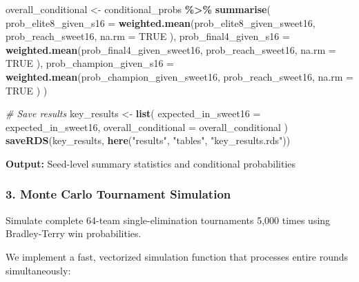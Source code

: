 \documentclass[
]{article}
\newenvironment{Shaded}{\begin{snugshade}}{\end{snugshade}}
\newcommand{\AttributeTok}[1]{\textcolor[rgb]{0.13,0.29,0.53}{#1}}
\newcommand{\CommentTok}[1]{\textcolor[rgb]{0.56,0.35,0.01}{\textit{#1}}}
\newcommand{\ConstantTok}[1]{\textcolor[rgb]{0.56,0.35,0.01}{#1}}
\newcommand{\FunctionTok}[1]{\textcolor[rgb]{0.13,0.29,0.53}{\textbf{#1}}}
\newcommand{\NormalTok}[1]{#1}
\newcommand{\OtherTok}[1]{\textcolor[rgb]{0.56,0.35,0.01}{#1}}
\newcommand{\SpecialCharTok}[1]{\textcolor[rgb]{0.81,0.36,0.00}{\textbf{#1}}}
\newcommand{\StringTok}[1]{\textcolor[rgb]{0.31,0.60,0.02}{#1}}
\begin{document}
\begin{Shaded}
\begin{Highlighting}[]
\NormalTok{overall\_conditional }\OtherTok{\textless{}{-}}\NormalTok{ conditional\_probs }\SpecialCharTok{\%\textgreater{}\%}
    \FunctionTok{summarise}\NormalTok{(}
        \AttributeTok{prob\_elite8\_given\_s16 =} \FunctionTok{weighted.mean}\NormalTok{(prob\_elite8\_given\_sweet16,}
\NormalTok{            prob\_reach\_sweet16,}
            \AttributeTok{na.rm =} \ConstantTok{TRUE}
\NormalTok{        ),}
        \AttributeTok{prob\_final4\_given\_s16 =} \FunctionTok{weighted.mean}\NormalTok{(prob\_final4\_given\_sweet16,}
\NormalTok{            prob\_reach\_sweet16,}
            \AttributeTok{na.rm =} \ConstantTok{TRUE}
\NormalTok{        ),}
        \AttributeTok{prob\_champion\_given\_s16 =} \FunctionTok{weighted.mean}\NormalTok{(prob\_champion\_given\_sweet16,}
\NormalTok{            prob\_reach\_sweet16,}
            \AttributeTok{na.rm =} \ConstantTok{TRUE}
\NormalTok{        )}
\NormalTok{    )}

\CommentTok{\# Save results}
\NormalTok{key\_results }\OtherTok{\textless{}{-}} \FunctionTok{list}\NormalTok{(}
    \AttributeTok{expected\_in\_sweet16 =}\NormalTok{ expected\_in\_sweet16,}
    \AttributeTok{overall\_conditional =}\NormalTok{ overall\_conditional}
\NormalTok{)}
\FunctionTok{saveRDS}\NormalTok{(key\_results, }\FunctionTok{here}\NormalTok{(}\StringTok{"results"}\NormalTok{, }\StringTok{"tables"}\NormalTok{, }\StringTok{"key\_results.rds"}\NormalTok{))}
\end{Highlighting}
\end{Shaded}

\textbf{Output:} Seed-level summary statistics and conditional
probabilities

\subsubsection{3. Monte Carlo Tournament
Simulation}\label{monte-carlo-tournament-simulation}

Simulate complete 64-team single-elimination tournaments 5,000 times
using Bradley-Terry win probabilities.

We implement a fast, vectorized simulation function that processes
entire rounds simultaneously:
\end{document}
